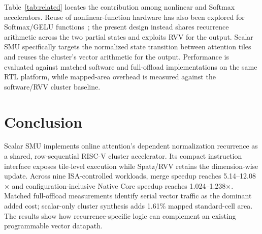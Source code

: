 \documentclass[journal]{IEEEtran}
\begin{document}
Table~\ref{tab:related} locates the contribution among nonlinear and
Softmax accelerators. Reuse of nonlinear-function hardware has also been
explored for Softmax/GELU functions~\cite{peltekis2024gelu}; the present
design instead shares recurrence arithmetic across the two partial states
and exploits RVV for the output. Scalar SMU specifically targets the normalized state
transition between attention tiles and reuses the cluster's vector
arithmetic for the output. Performance is evaluated against matched software and full-offload
implementations on the same RTL platform, while mapped-area overhead is
measured against the software/RVV cluster baseline.

\section{Conclusion}
Scalar SMU implements online attention's dependent normalization recurrence
as a shared, row-sequential RISC-V cluster accelerator. Its compact
instruction interface exposes tile-level execution while Spatz/RVV retains
the dimension-wise update. Across nine ISA-controlled workloads, merge
speedup reaches 5.14--12.08$\times$ and configuration-inclusive Native
Core speedup reaches 1.024--1.238$\times$. Matched full-offload measurements
identify serial vector traffic as the dominant added cost; scalar-only
cluster synthesis adds 1.61\% mapped standard-cell area. The results show
how recurrence-specific logic can complement an existing programmable
vector datapath.



\end{document}
